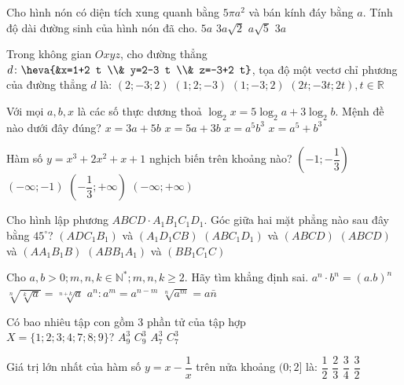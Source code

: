 \begin{ex}%
Cho hình nón có diện tích xung quanh bằng $5\pi a^2$ và bán kính đáy bằng $a$. Tính độ dài đường sinh của hình nón đã cho.
\choice
{\True $5 a$}
{$3 a \sqrt{2}$}
{$a \sqrt{5}$}
{$3 a$}

\end{ex}
\begin{ex}%
Trong không gian $O x y z$, cho đường thẳng $d\colon\heva{&x=1+2 t \\& y=2-3 t \\& z=-3+2 t}$, tọa độ một vectơ chỉ phương của đường thẳng $d$ là:
\choice
{\True $(2;-3; 2)$}
{$(1; 2;-3)$}
{$(1;-3; 2)$}
{$(2 t;-3 t; 2 t), t \in \mathbb{R}$}

\end{ex}
\begin{ex}%
Với mọi $a, b, x$ là các số thực dương thoả $\log_2 x=5\log_2 a+3\log_2 b$. Mệnh đề nào dưới đây đúng?
\choice
{$x=3 a+5 b$}
{$x=5 a+3 b$}
{\True $x=a^5 b^3$}
{$x=a^5+b^3$}

\end{ex}
\begin{ex}%
Hàm số $y=x^3+2 x^2+x+1$ nghịch biến trên khoảng nào?
\choice
{\True $\left(-1;-\dfrac{1}{3}\right)$}
{$(-\infty;-1)$}
{$\left(-\dfrac{1}{3};+\infty\right)$}
{$(-\infty;+\infty)$}

\end{ex}
\begin{ex}%
Cho hình lập phương $ABCD \cdot A_1 B_1 C_1 D_1$. Góc giữa hai mặt phẳng nào sau đây bằng $45^{\circ}$?
\choice
{$\left(ADC_1 B_1\right)$ và $\left(A_1 D_1 CB\right)$}
{\True $\left(ABC_1 D_1\right)$ và $(ABCD)$}
{$(ABCD)$ và $\left(AA_1 B_1 B\right)$}
{$\left(ABB_1 A_1\right)$ và $\left(BB_1 C_1 C\right)$}

\end{ex}
\begin{ex}%
Cho $a, b>0; m, n, k \in \mathbb{N}^{*}; m, n, k \geq 2$. Hãy tìm khẳng định sai.
\choice
{$a^{n} \cdot b^{n}=(a. b)^{n}$}
{\True $\sqrt[n]{\sqrt[k]{a}}=\sqrt[n+k]{a}$}
{$a^{n}\colon a^{m}=a^{n-m}$}
{$\sqrt[n]{a^{m}}=a \bar{n}$}

\end{ex}
\begin{ex}%
Có bao nhiêu tập con gồm $3$ phần tử của tập hợp\\ $X=\{1; 2; 3; 4; 7; 8; 9\}$?
\choice
{$A_9^3$}
{$C_9^3$}
{$A_7^3$}
{\True $C_7^3$}

\end{ex}
\begin{ex}%
Giá trị lớn nhất của hàm số $y=x-\dfrac{1}{x}$ trên nửa khoảng $(0; 2]$ là:
\choice
{$\dfrac{1}{2}$}
{$\dfrac{2}{3}$}
{$\dfrac{3}{4}$}
{\True $\dfrac{3}{2}$}

\end{ex}

